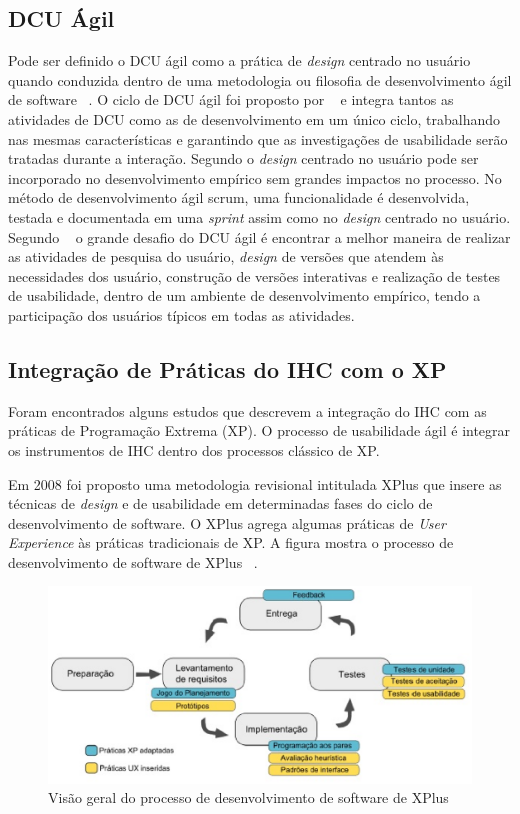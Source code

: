 \subsection{DCU Ágil}

Pode ser definido o DCU ágil como a prática de \emph{design} centrado no usuário quando conduzida dentro de uma metodologia ou filosofia de desenvolvimento ágil de software ~\cite{santos2012}. 
%
O ciclo de DCU ágil foi proposto por ~ e integra tantos as atividades de DCU como as de desenvolvimento em um único ciclo, trabalhando nas mesmas características e garantindo que as investigações de usabilidade serão tratadas durante a interação.
%
Segundo  o \emph{design} centrado no usuário pode ser incorporado no desenvolvimento empírico sem grandes impactos no processo. No método de desenvolvimento ágil scrum, uma funcionalidade é desenvolvida, testada e documentada em uma \textit{sprint} assim como no \emph{design} centrado no usuário. 
%	
Segundo ~ o grande desafio do DCU ágil é encontrar a melhor maneira de realizar as atividades de pesquisa do usuário, \emph{design} de versões que atendem às necessidades dos usuário, construção de versões interativas e realização de testes de usabilidade, dentro de um ambiente de desenvolvimento empírico, tendo a participação dos usuários típicos em todas as atividades.

\subsection{Integração de Práticas do IHC com o XP}

Foram encontrados alguns estudos que descrevem a integração do IHC com as práticas de Programação Extrema (XP). O processo de usabilidade ágil é integrar os instrumentos de IHC dentro dos processos clássico de XP. 

%
Em 2008 foi proposto uma metodologia revisional intitulada XPlus que insere as técnicas de \emph{design} e de usabilidade em determinadas fases do ciclo de desenvolvimento de software. O XPlus agrega algumas práticas de \textit{User Experience} às práticas tradicionais de XP. A figura mostra o processo de desenvolvimento de software de XPlus ~\cite{guimaraesxplus}.

\begin{figure}[h]
    \centering
    \includegraphics[keepaspectratio=true,scale=0.60]
      {figuras/xplus.eps}
    \caption{Visão geral do processo de desenvolvimento de software de XPlus ~\cite{guimaraesxplus}}
    \label{ciclo_xplus}
\end{figure}


